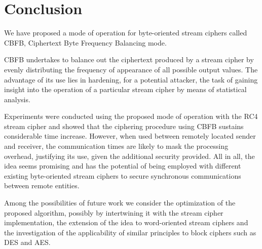 \documentclass[conference]{IEEEtran}
\begin{document}



\section{Conclusion}

We have proposed a mode of operation for byte-oriented stream ciphers called CBFB, Ciphertext Byte Frequency Balancing mode.

CBFB undertakes to balance out the ciphertext produced by a stream cipher by evenly distributing the frequency of appearance of all possible output values. The advantage of its use lies in hardening, for a potential attacker, the task of gaining insight into the operation of a particular stream cipher by means of statistical analysis.

Experiments were conducted using the proposed mode of operation with the RC4 stream cipher and showed that the ciphering procedure using CBFB sustains considerable time increase. However, when used between remotely located sender and receiver, the communication times are likely to mask the processing overhead, justifying its use, given the additional security provided. All in all, the idea seems promising and has the potential of being employed with different existing byte-oriented stream ciphers to secure synchronous communications between remote entities. 

Among the possibilities of future work we consider the optimization of the proposed algorithm, possibly by intertwining it with the stream cipher implementation, the extension of the idea to word-oriented stream ciphers and the investigation of the applicability of similar principles to block ciphers such as DES and AES.



\end{document}
